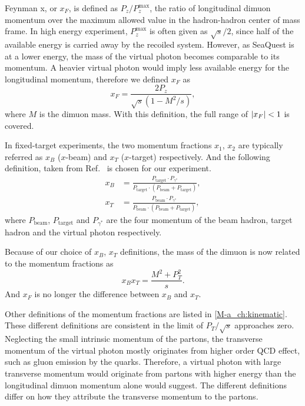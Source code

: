\documentclass[../main.tex]{subfiles}
\begin{document}
Feynman x, or $x_F$, is defined as $P_z/P_z^{\mathrm{max}}$, the ratio of longitudinal dimuon momentum
over the maximum allowed value in the hadron-hadron center of mass frame. In high energy
experiment, $P_z^{\mathrm{max}}$ is often given as $\sqrt{s}/2$, since half of the available energy is
carried away by the recoiled system.
However, as SeaQuest is at a lower energy, the mass of the virtual photon becomes comparable to its momentum.
A heavier virtual photon would imply less available energy for the longitudinal momentum,
therefore we defined $x_F$ as
\begin{equation}
	x_F = \frac{2P_z}{\sqrt{s}\left(1-M^2/s\right)},
\end{equation}
where $M$ is the dimuon mass. With this definition, the full range of $\abs{x_F}<1$ is covered.

In fixed-target experiments, the two momentum fractions $x_1$, $x_2$ are typically referred as $x_B$ ($x$-beam)
and $x_T$ ($x$-target) respectively.
And the following definition, taken from Ref.~\cite{Coester-1286} is chosen for our experiment.
\begin{equation}
	\begin{split}
		x_B & = \frac{P_{\textrm{target}}\cdot P_{\gamma^*}}{P_{\textrm{target}}\cdot (P_{\textrm{beam}}+P_{\textrm{target}})}, \\
		x_T & = \frac{P_{\textrm{beam}}\cdot P_{\gamma^*}}{P_{\textrm{beam}}\cdot (P_{\textrm{beam}}+P_{\textrm{target}})},
	\end{split}
\end{equation}
where $P_{\textrm{beam}}$, $P_{\textrm{target}}$ and $P_{\gamma^*}$ are the four momentum of the
beam hadron, target hadron and the virtual photon respectively.

Because of our choice of $x_B$, $x_T$ definitions, the mass of the dimuon is now related to
the momentum fractions as
\begin{equation}
	x_B x_T= \frac{M^2+P_T^2}{s}.
\end{equation}
And $x_F$ is no longer the difference between $x_B$ and $x_T$.

Other definitions of the momentum fractions are listed in \cref{M-a_ch:kinematic}. These different definitions
are consistent in the limit of $P_T/\sqrt{s}$ approaches zero.
Neglecting the small intrinsic momentum of the partons,
the transverse momentum of the virtual photon mostly originates from higher order QCD effect, such as gluon
emission by the quarks. Therefore, a virtual photon with large transverse momentum would originate
from partons with higher energy than the longitudinal dimuon momentum alone would suggest. The different
definitions differ on how they attribute the transverse momentum to the partons.
\end{document}
